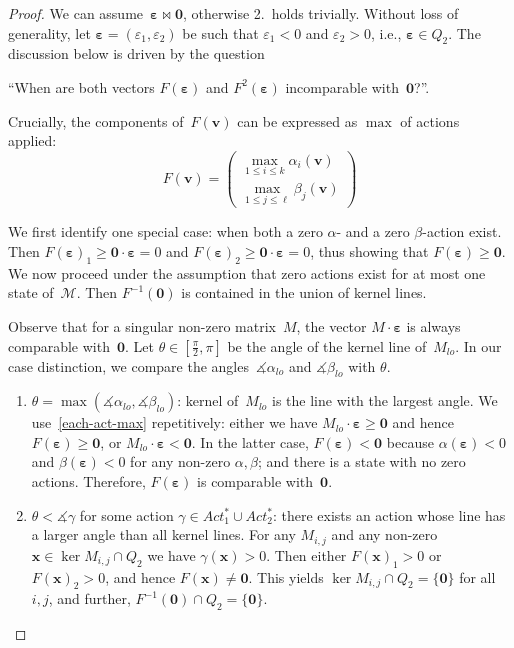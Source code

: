 \documentclass[10pt,a4paper]{amsart}
\newcommand{\eps}{\bm{\varepsilon}}
\newcommand{\mdp}{\mathcal{M}}
\begin{document}
\begin{proof}
	We can assume~$\eps\bowtie\bm{0}$, otherwise 2.\ holds trivially.
	Without loss of generality, let $\eps = (\varepsilon_1, \varepsilon_2)$ be such that $\varepsilon_1 < 0$ and $\varepsilon_2 > 0$, i.e., $\eps \in Q_2$.
	The discussion below is driven by the question 
	\begin{center}
		``When are both vectors $F(\eps)$ and $F^2(\eps)$ incomparable with~$\bm{0}$?''.
	\end{center}
	
	Crucially, the components of~$F(\bm{v})$ can be expressed as $\max$ of actions applied:
	\begin{equation}\label{each-act-max}
		F(\bm{v}) = 
		\begin{pmatrix} \max_{1\leq i \leq k}  \alpha_i(\bm{v}) \\ \max_{1\leq j \leq \ell}  \beta_j(\bm{v})
		\end{pmatrix}
	\end{equation}
	
	We first identify one special case: when both a zero $\alpha$- and a zero $\beta$-action exist.
	Then $F(\eps)_1 \geq \bm{0}\cdot\eps = 0$ and $F(\eps)_2 \geq \bm{0}\cdot\eps = 0$,
	thus showing that $F(\eps) \geq \bm{0}$.
	We now proceed under the assumption that zero actions exist for at most one state of~$\mdp$.
	Then $F^{-1}(\bm{0})$ is contained in the union of kernel lines.
	
		Observe that for a singular non-zero matrix~$M$, the vector $M\cdot\eps$ is always comparable with~$\bm{0}$.
		Let $\theta \in [\frac{\pi}{2}, \pi]$ be the angle of the kernel line of~$M_{lo}$.
		In our case distinction, we compare the angles~$\measuredangle \alpha_{lo}$ and $\measuredangle\beta_{lo}$ with $\theta$.
		\begin{enumerate}
			\item $\theta = \max(\measuredangle \alpha_{lo}, \measuredangle \beta_{lo})$: kernel of~$M_{lo}$ is the line with the largest angle. 
			We use~\cref{each-act-max} repetitively: either we have 
			$M_{lo}\cdot\eps \geq \bm{0}$ and hence $F(\eps) \geq \bm{0}$, or $M_{lo} \cdot\eps < \bm{0}$. 
			In the latter case, $F(\eps) < \bm{0}$ 
			because $\alpha(\eps) < 0$ and $\beta(\eps) < 0$ for any non-zero $\alpha,\beta$; 
			and there is a state with no zero actions.
			Therefore, $F(\eps)$ is comparable with~$\bm{0}$.
			\item $\theta < \measuredangle\gamma$ for some action $\gamma \in Act_1^* \cup Act_2^*$: there exists an action whose line has a larger angle than all kernel lines.
			For any $M_{i,j}$ and any non-zero $\bm{x} \in \ker M_{i,j} \cap Q_2$ we have $\gamma(\bm{x}) > 0$. 
			Then either $F(\bm{x})_1 > 0$ or $F(\bm{x})_2 > 0$, and hence $F(\bm{x}) \neq \bm{0}$. 
			This yields $\ker M_{i,j} \cap Q_2 = \{\bm{0}\}$ for all~$i,j$,
			and further, $F^{-1}(\bm{0}) \cap Q_2 = \{\bm{0}\}$. 
			

\end{enumerate}
\end{proof}
\end{document}
